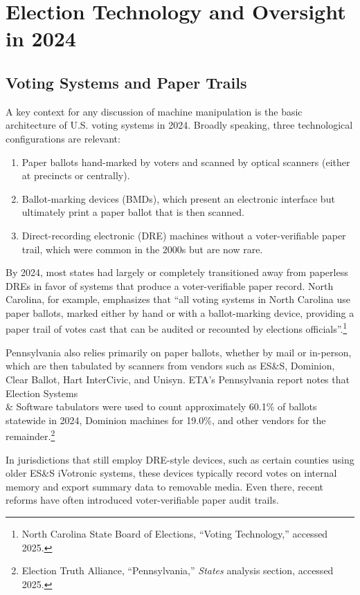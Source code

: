 \documentclass[12pt]{article}
\begin{document}
\section{Election Technology and Oversight in 2024}

\subsection{Voting Systems and Paper Trails}

A key context for any discussion of machine manipulation is the basic architecture of U.S. voting systems in 2024. Broadly speaking, three technological configurations are relevant:

\begin{enumerate}
    \item Paper ballots hand-marked by voters and scanned by optical scanners (either at precincts or centrally).
    \item Ballot-marking devices (BMDs), which present an electronic interface but ultimately print a paper ballot that is then scanned.
    \item Direct-recording electronic (DRE) machines without a voter-verifiable paper trail, which were common in the 2000s but are now rare.
\end{enumerate}

By 2024, most states had largely or completely transitioned away from paperless DREs in favor of systems that produce a voter-verifiable paper record. North Carolina, for example, emphasizes that \enquote{all voting systems in North Carolina use paper ballots, marked either by hand or with a ballot-marking device, providing a paper trail of votes cast that can be audited or recounted by elections officials}.\footnote{North Carolina State Board of Elections, ``Voting Technology,'' accessed 2025.}

Pennsylvania also relies primarily on paper ballots, whether by mail or in-person, which are then tabulated by scanners from vendors such as ES\&S, Dominion, Clear Ballot, Hart InterCivic, and Unisyn. ETA's Pennsylvania report notes that Election Systems \\ \& Software tabulators were used to count approximately 60.1\% of ballots statewide in 2024, Dominion machines for 19.0\%, and other vendors for the remainder.\footnote{Election Truth Alliance, ``Pennsylvania,'' \emph{States} analysis section, accessed 2025.}

In jurisdictions that still employ DRE-style devices, such as certain counties using older ES\&S iVotronic systems, these devices typically record votes on internal memory and export summary data to removable media. Even there, recent reforms have often introduced voter-verifiable paper audit trails.
\end{document}
